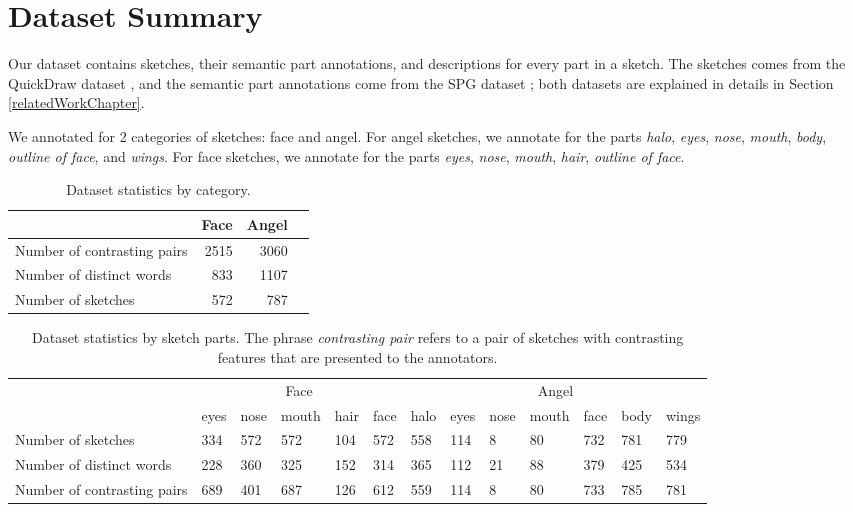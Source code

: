 \section{Dataset Summary} \label{datasummary}
Our dataset contains sketches, their semantic part annotations, and descriptions for every part in a sketch. 
The sketches comes from the QuickDraw dataset \citep{ha2017neural}, and the semantic part annotations come from the SPG dataset \citep{spg_paper}; both datasets are explained in details in Section \ref{relatedWorkChapter}.

We annotated for 2 categories of sketches: face and angel. 
For angel sketches, we annotate for the parts \textit{halo}, \textit{eyes}, \textit{nose}, \textit{mouth}, \textit{body}, \textit{outline of face}, and \textit{wings}. 
For face sketches, we annotate for the parts \textit{eyes}, \textit{nose}, \textit{mouth}, \textit{hair}, \textit{outline of face}. 


\begin{table}[!h]
\begin{minipage}{1\textwidth}
\begin{center}
{\small
\begin{tabular}{lrrr}
\toprule
~ & Face & Angel \\
\midrule
Number of contrasting pairs & 2515 & 3060 \\
Number of distinct words & 833 & 1107 \\
Number of sketches & 572 & 787 \\
\bottomrule
\end{tabular}}
\caption{Dataset statistics by category.}
\label{table:dataset_stats1}
\end{center}
\end{minipage}
\end{table}

\begin{table}[!h]
\begin{minipage}{1\textwidth}
\begin{center}
{\small
\begin{tabular}{p{9em} | p{1.5em}p{1.5em}p{2em}p{1.5em}p{1.5em} | p{1.5em}p{1.5em}p{1.5em}p{2em}p{1.5em}p{1.5em}p{1.5em} }
\toprule
~ & \multicolumn{5}{c}{Face} & \multicolumn{7}{c}{Angel}\\
~ & eyes & nose & mouth & hair & face & halo & eyes & nose & mouth & face & body & wings  \\
\midrule
Number of sketches & 
334 & 572 & 572 & 104 & 572 &
558 & 114 & 8 & 80 & 732 & 781 & 779 \\
Number of distinct words & 
228 & 360 & 325 & 152 & 314 & 
365 & 112 & 21 & 88 & 379 & 425 & 534 \\
Number of contrasting pairs &
689 & 401 & 687 & 126 & 612 &
559 & 114 & 8 & 80 & 733 & 785 & 781 \\
\bottomrule
\end{tabular}}
\caption{Dataset statistics by sketch parts. The phrase \textit{contrasting pair} refers to a pair of sketches with contrasting features that are presented to the annotators.}
\label{table:dataset_stats_byparts}
\end{center}
\end{minipage}
\end{table}


